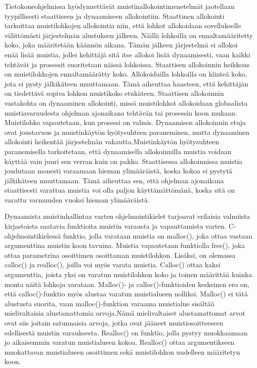 Tietokoneohjelmissa hyödynnettävät muistinallokointimenetelmät jaotellaan tyypillisesti staattiseen ja dynaamiseen allokointiin. Staattinen allokointi tarkoittaa muistilohkojen allokointia niin, että lohkot allokoidaan sovellukselle välittömästi järjestelmän alustuksen jälkeen. Näillä lohkoilla on ennaltamääritetty koko, joka määritetään käännön aikana. Tämän jälkeen järjestelmä ei allokoi enää lisää muistia, jollei kehittäjä sitä itse allokoi lisää dynaamisesti, vaan kaikki tehtävät ja prosessit suoritetaan näissä lohkoissa. Staattisen allokoinnin heikkous on muistilohkojen ennaltamäärätty koko. Allokoiduilla lohkoilla on kiinteä koko, jota ei pysty jälkikäteen muuttamaan. Tämä aiheuttaa haasteen, että kehittäjän on tiedettävä sopiva lohkon muistikoko etukäteen. Staattisen allokoinnin vastakohta on dynaaminen allokointi, missä muistilohkot allokoidaan globaalista muistiavaruudesta ohjelman ajonaikana tehtävän tai prosessin koon mukaan. Muistilohko vapautetaan, kun prosessi on valmis. Dynaamisen allokoinnin etuja ovat joustavuus ja muistinkäytön hyötysuhteen paraneminen, mutta dynaaminen allokointi heikentää järjestelmän vakautta.\cite{daroemmfera@2006}Muistinkäytön hyötysuhteen paranemisella tarkoitetaan, että dynaamisella allokoinnilla muistia voidaan käyttää vain juuri sen verran kuin on pakko. Staattisessa allokoinnissa muistia joudutaan monesti varaamaan hieman ylimääräistä, koska kokoa ei pystytä jälkikäteen muuttamaan. Tämä aiheuttaa sen, että ohjelman ajonaikana staattisesti varattua muistia voi olla paljon käyttämättömänä, koska sitä on varattu varmuuden vuoksi hieman ylimääräistä.

Dynaamista muistinhallintaa varten ohjelmointikielet tarjoavat erilaisia valmiista kirjastoista saatavia funktioita muistin varausta ja vapauttamista varten. C-ohjelmointikielessä funktio, jolla varataan muistia on malloc(), joka ottaa vastaan argumenttina muistin koon tavuina. Muistia vapautetaan funktiolla free(), joka ottaa parametrina osoittimen osoittaman muistilohkon. Lisäksi, on olemassa calloc() ja realloc(), joilla voi myös varata muistia. Calloc() ottaa kaksi argumenttia, joista yksi on varatun muistilohkon koko ja toinen määrittää kuinka monta näitä lohkoja varataan. Malloc()- ja calloc()-funktioiden keskeinen ero on, että calloc()-funktio myös alustaa varatun muistialueen nolliksi. Malloc() ei tätä alustusta suorita, vaan malloc()-funktion varaama muistialue sisältää mielivaltaisia alustamattomia arvoja.\cite{c2015book}Nämä mielivaltaiset alustamattomat arvot ovat siis joitain satunnaisia arvoja, jotka ovat jääneet muistiosoitteeseen edellisestä muistin varauksesta. Realloc() on funktio, jolla pystyy muokkaamaan jo aikaisemmin varatun muistialueen kokoa. Realloc() ottaa argumentikseen muokattavan muistialueen osoittimen sekä muistilohkon uudelleen määritetyn koon\cite{c2015book}.

